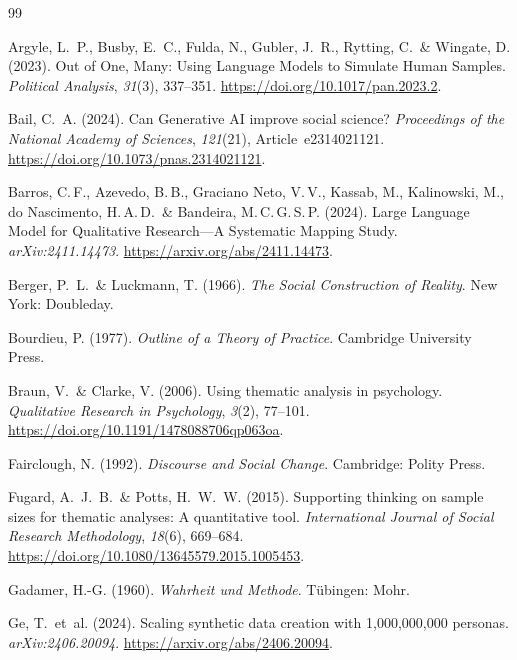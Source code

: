 \documentclass[11pt,a4paper]{article}
\begin{document}

\begin{thebibliography}{99}

  Argyle, L.~P., Busby, E.~C., Fulda, N., Gubler, J.~R., Rytting, C.~\& Wingate, D. (2023).
  Out of One, Many: Using Language Models to Simulate Human Samples.
  \textit{Political Analysis}, \textit{31}(3), 337--351. \url{https://doi.org/10.1017/pan.2023.2}.

  Bail, C.~A. (2024).
  Can Generative AI improve social science?
  \textit{Proceedings of the National Academy of Sciences}, \textit{121}(21), Article~e2314021121. \url{https://doi.org/10.1073/pnas.2314021121}.

  Barros, C.\,F., Azevedo, B.\,B., Graciano Neto, V.\,V., Kassab, M., Kalinowski, M., do Nascimento, H.\,A.\,D.~\& Bandeira, M.\,C.\,G.\,S.\,P. (2024).
  Large Language Model for Qualitative Research---A Systematic Mapping Study.
  \textit{arXiv:2411.14473}. \url{https://arxiv.org/abs/2411.14473}.

  Berger, P.~L.~\& Luckmann, T. (1966).
  \textit{The Social Construction of Reality}.
  New York: Doubleday.

  Bourdieu, P. (1977).
  \textit{Outline of a Theory of Practice}.
  Cambridge University Press.

  Braun, V.~\& Clarke, V. (2006).
  Using thematic analysis in psychology.
  \textit{Qualitative Research in Psychology}, \textit{3}(2), 77--101. \url{https://doi.org/10.1191/1478088706qp063oa}.

  Fairclough, N. (1992).
  \textit{Discourse and Social Change}.
  Cambridge: Polity Press.

  Fugard, A.~J.~B.~\& Potts, H.~W.~W. (2015).
  Supporting thinking on sample sizes for thematic analyses: A quantitative tool.
  \textit{International Journal of Social Research Methodology}, \textit{18}(6), 669--684. \url{https://doi.org/10.1080/13645579.2015.1005453}.

  Gadamer, H.-G. (1960).
  \textit{Wahrheit und Methode}.
  Tübingen: Mohr.

  Ge, T.~et~al. (2024).
  Scaling synthetic data creation with 1{,}000{,}000{,}000 personas.
  \textit{arXiv:2406.20094}. \url{https://arxiv.org/abs/2406.20094}.


\end{thebibliography}
\end{document}
